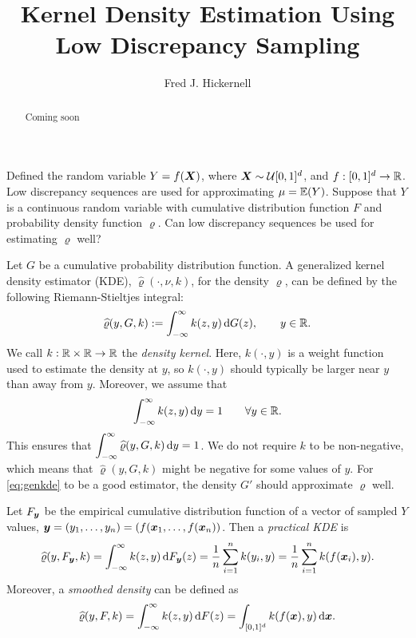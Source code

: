 \documentclass[letterpaper]{amsart}
\newcommand{\hvarrho}{\widehat{\varrho}}
\begin{document}
\title{Kernel Density Estimation Using Low Discrepancy Sampling}
\author{Fred J. Hickernell}
\begin{abstract} Coming soon
\end{abstract}

\maketitle

Defined the random variable $Y = f(\boldsymbol{X})$, where $\boldsymbol{X} \sim \mathcal{U}[0,1]^d$, and $f:[0,1]^d \to \mathbb{R}$.  Low discrepancy sequences are used for approximating  $\mu = \operatorname{\mathbb{E}}(Y)$.  Suppose that $Y$ is a continuous random variable with cumulative distribution function $F$ and probability density function $\varrho$.  Can low discrepancy sequences be used for estimating $\varrho$ well?  

Let $G$ be a cumulative probability distribution function.  A generalized kernel density estimator (KDE), $\hvarrho(\cdot,\nu,k)$, for the density $\varrho$, can be defined by the following Riemann-Stieltjes integral:
\begin{equation}
	\label{eq:genkde}
\hvarrho(y,G,k) := \int_{-\infty}^{\infty} k(z,y) \, \dif G(z), \qquad y \in \reals.
\end{equation}
We call $k:\mathbb{R} \times \mathbb{R} \to \mathbb{R}$ the \emph{density kernel}. Here, $k(\cdot,y)$ is a weight function used to estimate the density at $y$, so $k(\cdot,y)$ should typically be larger near $y$ than away from $y$.   Moreover, we assume that
\begin{equation}
	\label{eq:kintegral}
	\int_{-\infty}^{\infty} k(z,y) \, {\rm d} y = 1 \qquad \forall y \in \mathbb{R}.
\end{equation}
This ensures that $\displaystyle \int_{-\infty}^{\infty} \hvarrho(y,G,k) \, \dif y = 1$.  We do not require $k$ to be non-negative, which means that $\hvarrho(y,G,k)$ might be negative for some values of $y$.  For \eqref{eq:genkde} to be a good estimator, the density $G'$ should approximate $\varrho$ well.

Let $F_{\boldsymbol{y}}$ be the empirical cumulative distribution function of a vector of sampled $Y$ values, $\boldsymbol{y} = (y_1, \ldots, y_n) = (f(\boldsymbol{x}_1, \ldots, f(\boldsymbol{x}_n))$.  Then a \emph{practical KDE} is
\begin{equation*}
\hvarrho(y,F_{\vy},k) = \int_{-\infty}^{\infty} k(z,y) \, \dif F_{\vy}(z)  = \frac 1n \sum_{i=1}^n k(y_i,y) \\
 = \frac 1n \sum_{i=1}^n k(f(\vx_i),y) .
\end{equation*}
Moreover, a \emph{smoothed density} can be defined as
\[
\hvarrho(y,F,k) = \int_{-\infty}^{\infty} k(z,y) \, \dif F(z) = \int_{[0,1]^d} k(f(\vx),y) \,  \dif \vx.
\]
\end{document}
